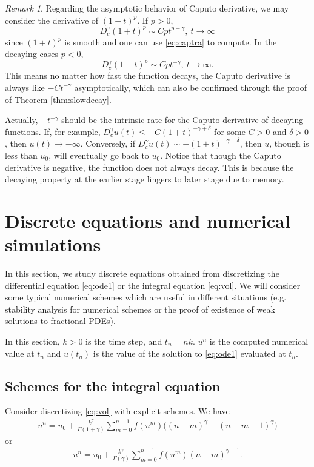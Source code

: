 \documentclass[12pt]{amsart}%
\theoremstyle{definition}
\theoremstyle{remark}
\newtheorem{rmk}[thm]{Remark}
\renewcommand{\le}{\leqslant}
\begin{document}
\begin{rmk}
Regarding the asymptotic behavior of Caputo derivative, we may consider the derivative of $(1+t)^p$. If $p>0$, \[
D_c^{\gamma}(1+t)^p \sim Cp t^{p-\gamma}, ~ t\to\infty
\]
since $(1+t)^p$ is smooth and one can use \eqref{eq:captra} to compute. In the decaying cases $p<0$, \[
D_c^{\gamma}(1+t)^p\sim Cp t^{-\gamma}, ~ t\to\infty.
\]
This means no matter how fast the function decays, the Caputo derivative is always like $-Ct^{-\gamma}$ asymptotically, which can also be confirmed through the proof of Theorem \ref{thm:slowdecay}. 

Actually, $-t^{-\gamma}$ should be the intrinsic rate for the Caputo derivative of decaying functions. If, for example, $D_c^{\gamma}u(t) \le -C(1+t)^{-\gamma+\delta}$ for some $C>0$ and $\delta>0$, then $u(t)\to-\infty$. 
Conversely, if $D_c^{\gamma}u(t) \sim -(1+t)^{-\gamma-\delta}$, then $u$, though is less than $u_0$, will eventually go back to $u_0$. Notice that though the Caputo derivative is negative, the function does not always decay. This is because the decaying property at the earlier stage lingers to later stage due to memory.
\end{rmk}



\section{Discrete equations and numerical simulations}\label{sec:discrete}

In this section, we study discrete equations obtained from discretizing the differential equation  \eqref{eq:ode1} or the integral equation \eqref{eq:vol}. We will consider some typical numerical schemes which are useful in different situations (e.g. stability analysis for numerical schemes or the proof of existence of weak solutions to fractional PDEs). 

In this section,  $k>0$ is the time step, and $t_n=nk$. $u^n$ is the computed numerical value at $t_n$ and $u(t_n)$ is the value of the solution to \eqref{eq:ode1} evaluated at $t_n$. 

\subsection{Schemes for the integral equation}

Consider discretizing \eqref{eq:vol} with explicit schemes. We have
\begin{gather}\label{eq:schemeInt}
u^{n}=u_0+\frac{k^{\gamma}}{\Gamma(1+\gamma)}\sum_{m=0}^{n-1} f(u^{m})\Big((n-m)^{\gamma}-(n-m-1)^{\gamma}\Big)
\end{gather}
or
\begin{gather}\label{eq:schemeInt2}
u^{n}=u_0+\frac{k^{\gamma}}{\Gamma(\gamma)}\sum_{m=0}^{n-1} f(u^{m})(n-m)^{\gamma-1}.
\end{gather}
\end{document}
